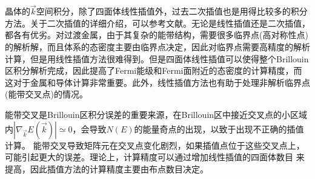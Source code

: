 晶体的$\vec k$空间积分，除了四面体线性插值外，过去二次插值也是用得比较多的积分方法。关于二次插值的详细介绍，可以参考文献\cite{AP67-15_1971}。无论是线性插值还是二次插值，都各有优劣。对过渡金属，由于其复杂的能带结构，需要很多临界点(高对称性点)的解析解，而且体系的态密度主要由临界点决定，因此对临界点需要高精度的解析计算，但是用线性插值方法很难得到。但是四面体线性插值可以使得整个\textrm{Brillouin}区积分解析完成，因此提高了Fermi能级和Fermi面附近的态密度的计算精度，而这对于金属和导体计算非常重要。此外，线性插值方法也有助于处理非解析临界点(能带交叉点)的情况\cite{PLA28-570_1969,PRB7-891_1973,PRB5-1276_1972}。

能带交叉是\textrm{Brillouin}区积分误差的重要来源，在Brillouin区中接近交叉点的小区域内$|\nabla_{\vec k}E(\vec k)|\simeq0$，会导致$N(E)$的能量奇点的出现，以致于出现不正确的插值计算。%
能带交叉导致矩阵元在交叉点变化剧烈，如果插值点位于这些交叉点上，可能引起更大的误差。理论上，计算精度可以通过增加线性插值的四面体数目%
来提高，因此插值方法的计算精度主要由布点数目决定。


